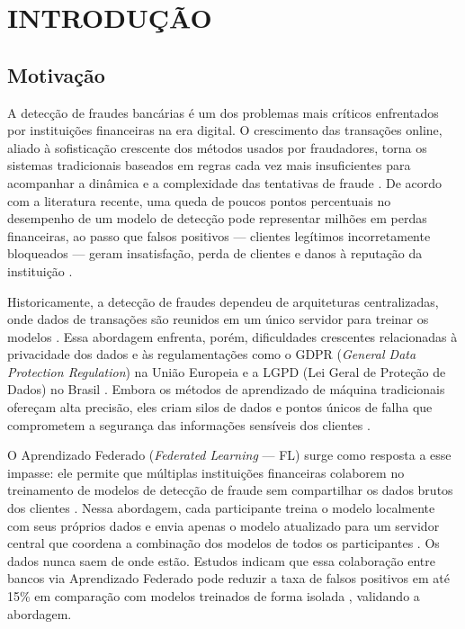 \section{INTRODUÇÃO}

\subsection{Motivação}

A detecção de fraudes bancárias é um dos problemas mais críticos enfrentados por instituições financeiras na era digital. O crescimento das transações online, aliado à sofisticação crescente dos métodos usados por fraudadores, torna os sistemas tradicionais baseados em regras cada vez mais insuficientes para acompanhar a dinâmica e a complexidade das tentativas de fraude \cite{jesus2022baf}. De acordo com a literatura recente, uma queda de poucos pontos percentuais no desempenho de um modelo de detecção pode representar milhões em perdas financeiras, ao passo que falsos positivos --- clientes legítimos incorretamente bloqueados --- geram insatisfação, perda de clientes e danos à reputação da instituição \cite{kennedy2025financial}.

Historicamente, a detecção de fraudes dependeu de arquiteturas centralizadas, onde dados de transações são reunidos em um único servidor para treinar os modelos \cite{farrukh2025blockchain}. Essa abordagem enfrenta, porém, dificuldades crescentes relacionadas à privacidade dos dados e às regulamentações como o GDPR (\textit{General Data Protection Regulation}) na União Europeia e a LGPD (Lei Geral de Proteção de Dados) no Brasil \cite{gdpr2016, voigt2017gdpr}. Embora os métodos de aprendizado de máquina tradicionais ofereçam alta precisão, eles criam silos de dados e pontos únicos de falha que comprometem a segurança das informações sensíveis dos clientes \cite{farrukh2025blockchain}.

O Aprendizado Federado (\textit{Federated Learning} --- FL) surge como resposta a esse impasse: ele permite que múltiplas instituições financeiras colaborem no treinamento de modelos de detecção de fraude sem compartilhar os dados brutos dos clientes \cite{mcmahan2017fedavg, shi2023survey}. Nessa abordagem, cada participante treina o modelo localmente com seus próprios dados e envia apenas o modelo atualizado para um servidor central que coordena a combinação dos modelos de todos os participantes \cite{bonawitz2019scale}. Os dados nunca saem de onde estão. Estudos indicam que essa colaboração entre bancos via Aprendizado Federado pode reduzir a taxa de falsos positivos em até 15\% em comparação com modelos treinados de forma isolada \cite{kennedy2025financial}, validando a abordagem.

